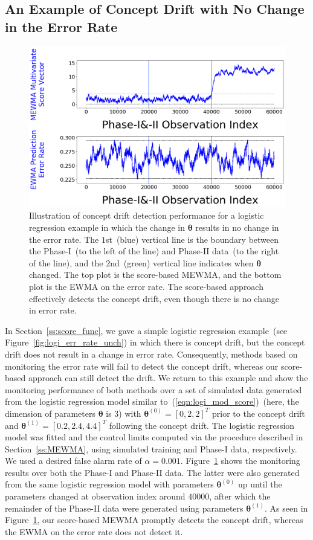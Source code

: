 \documentclass[twoside,11pt]{article}
\begin{document}
\subsection{An Example of Concept Drift with No Change in the Error Rate}
\label{ss:cd_no_err_change}
\begin{figure}[!htp]
\centering
\includegraphics[width = .8\linewidth]{../figures/v14/sim_11/non_nnet_nonunif_ch_f_0_2/1_sim11_logi_1e-08_0_0015_1.png}
  \caption{Illustration of concept drift detection performance for a logistic regression example in which the change in $\bm{\theta}$ results in no change in the error rate. The $1$st~(blue) vertical line is the boundary between the Phase-I~(to the left of the line) and Phase-II data~(to the right of the line), and the $2$nd~(green) vertical line indicates when $\bm{\theta}$ changed. The top plot is the score-based MEWMA, and the bottom plot is the EWMA on the error rate. The score-based approach effectively detects the concept drift, even though there is no change in error rate.}
  \label{fig:exp_no_err_ch}
\end{figure}
In Section~\ref{ss:score_func}, we gave a simple logistic regression example~(see Figure~\ref{fig:logi_err_rate_unch}) in which there is concept drift, but the concept drift does not result in a change in error rate. Consequently, methods based on monitoring the error rate will fail to detect the concept drift, whereas our score-based approach can still detect the drift. We return to this example and show the monitoring performance of both methods over a set of simulated data generated from the logistic regression model similar to~(\ref{eqn:logi_mod_score})~(here, the dimension of parameters $\bm{\theta}$ is $3$) with $\bm{\theta}^{(0)} = [0,2,2]^T$ prior to the concept drift and $\bm{\theta}^{(1)} = [0.2,2.4,4.4]^T$ following the concept drift. The logistic regression model was fitted and the control limits computed via the procedure described in Section~\ref{ss:MEWMA}, using simulated training and Phase-I data, respectively. We used a desired false alarm rate of $\alpha=0.001$. Figure~\ref{fig:exp_no_err_ch} shows the monitoring results over both the Phase-I and Phase-II data. The latter were also generated from the same logistic regression model with parameters $\bm{\theta}^{(0)}$ up until the parameters changed at observation index around $40000$, after which the remainder of the Phase-II data were generated using parameters $\bm{\theta}^{(1)}$. As seen in Figure~\ref{fig:exp_no_err_ch}, our score-based MEWMA promptly detects the concept drift, whereas the EWMA on the error rate does not detect it. 
\end{document}
